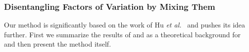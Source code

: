 \documentclass[12pt,a4paper]{article}
\begin{document}


\subsubsection{Disentangling Factors of Variation by Mixing Them}
Our method is significantly based on the work of Hu \textit{et al.}~\cite{DisentFacOfVarByMixTh} and pushes its idea further. First we summarize the results of \cite{ChallengInDisentIFoF} and \cite{UnderstDegenAndAmbInAT} as a theoretical background for \cite{DisentFacOfVarByMixTh} and then present the method itself. 
\end{document}
